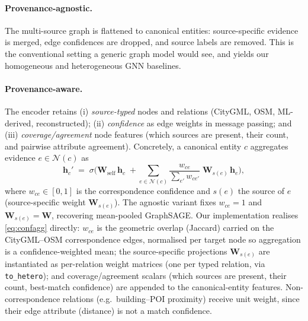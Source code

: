 \paragraph{Provenance-agnostic.} The multi-source graph is flattened to canonical
entities: source-specific evidence is merged, edge confidences are dropped, and
source labels are removed. This is the conventional setting a generic graph model
would see, and yields our homogeneous and heterogeneous GNN baselines.

\paragraph{Provenance-aware.} The encoder retains (i) \emph{source-typed} nodes
and relations (CityGML, OSM, ML-derived, reconstructed); (ii) \emph{confidence}
as edge weights in message passing; and (iii) \emph{coverage/agreement} node
features (which sources are present, their count, and pairwise attribute
agreement). Concretely, a canonical entity $c$ aggregates evidence $e\in\mathcal
N(c)$ as
\begin{equation}
\mathbf h_c' \;=\; \sigma\!\Big(\mathbf W_{\text{self}}\,\mathbf h_c
\;+\!\!\sum_{e\in\mathcal N(c)}\!\frac{w_{ce}}{\textstyle\sum_{e'} w_{ce'}}\;
\mathbf W_{s(e)}\,\mathbf h_e\Big),
\label{eq:confagg}
\end{equation}
where $w_{ce}\in[0,1]$ is the correspondence confidence and $s(e)$ the source of
$e$ (source-specific weight $\mathbf W_{s(e)}$). The agnostic variant fixes
$w_{ce}=1$ and $\mathbf W_{s(e)}=\mathbf W$, recovering mean-pooled
GraphSAGE. Our implementation realises \cref{eq:confagg} directly: $w_{ce}$ is
the geometric overlap (Jaccard) carried on the CityGML--OSM correspondence
edges, normalised per target node so aggregation is a confidence-weighted mean;
the source-specific projections $\mathbf W_{s(e)}$ are instantiated as
per-relation weight matrices (one per typed relation, via
\texttt{to\_hetero}); and coverage/agreement scalars (which sources are present,
their count, best-match confidence) are appended to the canonical-entity
features. Non-correspondence relations (e.g.\ building--POI proximity) receive
unit weight, since their edge attribute (distance) is not a match confidence.

